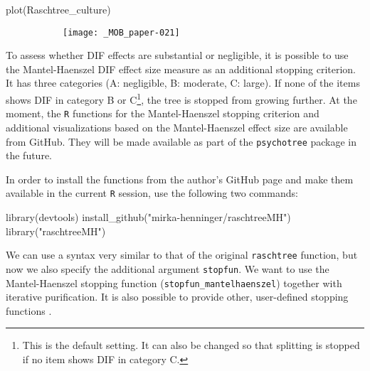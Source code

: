 \documentclass[doc,floatsintext,natbib]{apa7}
\begin{document}
\begin{Schunk}
\begin{Sinput}
 plot(Raschtree_culture)
\end{Sinput}
\end{Schunk}

\begin{figure}%
\caption{Rasch tree fitted to the SPISA quiz items using the default stopping criterion based on statistical significance.}
\begin{subfigure}{1.2\textwidth}
\texttt{[image: \_MOB\_paper-021]}
\end{subfigure}
\label{fig:MHtree1}
\end{figure}%


To assess whether DIF effects are substantial or negligible, it is possible to use the Mantel-Haenszel DIF effect size measure as an additional stopping criterion. It has three categories (A: negligible, B: moderate, C: large). If none of the items shows DIF in category B or C\footnote{This is the default setting. It can also be changed so that splitting is stopped if no item shows DIF in category C.}, the tree is stopped from growing further.
At the moment, the \texttt{R} functions for the Mantel-Haenszel stopping criterion and additional visualizations based on the Mantel-Haenszel effect size are available from GitHub. They will be made available as part of the \texttt{psychotree} package in the future.

In order to install the functions from the author's GitHub page and make them available in the current \texttt{R} session, use the following two commands:

\begin{Schunk}
\begin{Sinput}
 library(devtools)
 install_github("mirka-henninger/raschtreeMH")
 library("raschtreeMH")
\end{Sinput}
\end{Schunk}

We can use a syntax very similar to that of the original \texttt{raschtree} function, but now we also specify the additional argument \texttt{stopfun}. We want to use the Mantel-Haenszel stopping function (\texttt{stopfun\_mantelhaenszel}) together with iterative purification. It is also possible to provide other, user-defined stopping functions \citep[see][for details]{HennyDeba23}.
\end{document}
